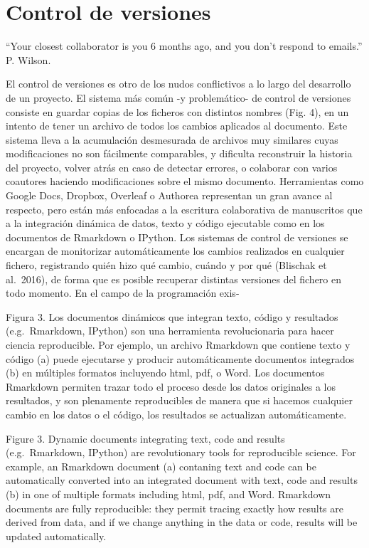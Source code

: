 \documentclass[]{tufte-handout}
\begin{document}
\hypertarget{control-de-versiones}{%
\section{Control de versiones}\label{control-de-versiones}}

``Your closest collaborator is you 6 months ago, and you don't respond
to emails.'' P. Wilson.

El control de versiones es otro de los nudos conflictivos a lo largo del
desarrollo de un proyecto. El sistema más común -y problemático- de
control de versiones consiste en guardar copias de los ficheros con
distintos nombres (Fig. 4), en un intento de tener un archivo de todos
los cambios aplicados al documento. Este sistema lleva a la acumulación
desmesurada de archivos muy similares cuyas modificaciones no son
fácilmente comparables, y dificulta reconstruir la historia del
proyecto, volver atrás en caso de detectar errores, o colaborar con
varios coautores haciendo modificaciones sobre el mismo documento.
Herramientas como Google Docs, Dropbox, Overleaf o Authorea representan
un gran avance al respecto, pero están más enfocadas a la escritura
colaborativa de manuscritos que a la integración dinámica de datos,
texto y código ejecutable como en los documentos de Rmarkdown o IPython.
Los sistemas de control de versiones se encargan de monitorizar
automáticamente los cambios realizados en cualquier fichero, registrando
quién hizo qué cambio, cuándo y por qué (Blischak et al.~2016), de forma
que es posible recuperar distintas versiones del fichero en todo
momento. En el campo de la programación exis-

Figura 3. Los documentos dinámicos que integran texto, código y
resultados (e.g.~Rmarkdown, IPython) son una herramienta revolucionaria
para hacer ciencia reproducible. Por ejemplo, un archivo Rmarkdown que
contiene texto y código (a) puede ejecutarse y producir automáticamente
documentos integrados (b) en múltiples formatos incluyendo html, pdf, o
Word. Los documentos Rmarkdown permiten trazar todo el proceso desde los
datos originales a los resultados, y son plenamente reproducibles de
manera que si hacemos cualquier cambio en los datos o el código, los
resultados se actualizan automáticamente.

Figure 3. Dynamic documents integrating text, code and results
(e.g.~Rmarkdown, IPython) are revolutionary tools for reproducible
science. For example, an Rmarkdown document (a) contaning text and code
can be automatically converted into an integrated document with text,
code and results (b) in one of multiple formats including html, pdf, and
Word. Rmarkdown documents are fully reproducible: they permit tracing
exactly how results are derived from data, and if we change anything in
the data or code, results will be updated automatically.
\end{document}
